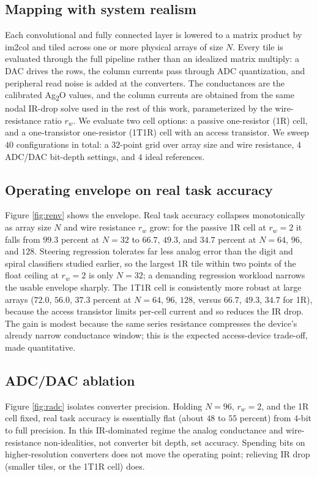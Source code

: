 \documentclass[conference]{IEEEtran}
\begin{document}
\subsection{Mapping with system realism}
Each convolutional and fully connected layer is lowered to a matrix product by
im2col and tiled across one or more physical arrays of size $N$. Every tile is
evaluated through the full pipeline rather than an idealized matrix multiply: a
DAC drives the rows, the column currents pass through ADC quantization, and
peripheral read noise is added at the converters. The conductances are the
calibrated Ag\textsubscript{2}O values, and the column currents are obtained
from the same nodal IR-drop solve used in the rest of this work, parameterized
by the wire-resistance ratio $r_w$. We evaluate two cell options: a passive
one-resistor (1R) cell, and a one-transistor one-resistor (1T1R) cell with an
access transistor. We sweep $40$ configurations in total: a $32$-point grid over
array size and wire resistance, $4$ ADC/DAC bit-depth settings, and $4$ ideal
references.

\subsection{Operating envelope on real task accuracy}
Figure \ref{fig:renv} shows the envelope. Real task accuracy collapses
monotonically as array size $N$ and wire resistance $r_w$ grow: for the passive
1R cell at $r_w=2$ it falls from $99.3$ percent at $N=32$ to $66.7$, $49.3$, and
$34.7$ percent at $N=64$, $96$, and $128$. Steering regression tolerates far less
analog error than the digit and spiral classifiers studied earlier, so the
largest 1R tile within two points of the float ceiling at $r_w=2$ is only $N=32$;
a demanding regression workload narrows the usable envelope sharply. The 1T1R
cell is consistently more robust at large arrays ($72.0$, $56.0$, $37.3$ percent
at $N=64$, $96$, $128$, versus $66.7$, $49.3$, $34.7$ for 1R), because the access
transistor limits per-cell current and so reduces the IR drop. The gain is modest
because the same series resistance compresses the device's already narrow
conductance window; this is the expected access-device trade-off, made
quantitative.

\subsection{ADC/DAC ablation}
Figure \ref{fig:radc} isolates converter precision. Holding $N=96$, $r_w=2$, and
the 1R cell fixed, real task accuracy is essentially flat (about $48$ to $55$
percent) from $4$-bit to full precision. In this IR-dominated regime the analog
conductance and wire-resistance non-idealities, not converter bit depth, set
accuracy. Spending bits on higher-resolution converters does not move the
operating point; relieving IR drop (smaller tiles, or the 1T1R cell) does.
\end{document}
